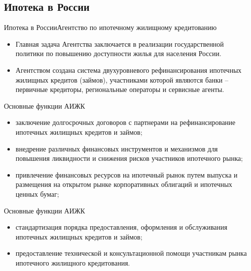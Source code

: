 \documentclass[_Banking_p2.tex]{subfiles}
\begin{document}
\subsection{Ипотека в России}
\begin{frame}{Ипотека в России}{Агентство по ипотечному жилищному кредитованию}
\begin{itemize}[<	+->]

\item
Главная задача Агентства заключается в реализации государственной политики по повышению доступности жилья для населения России.


\item
Агентством создана система двухуровневого рефинансирования ипотечных жилищных кредитов (займов), участниками которой являются банки – первичные кредиторы, региональные операторы и сервисные агенты.
\end{itemize}
\end{frame}

\begin{frame}{Основные функции АИЖК}
\begin{itemize}[<+->]
\item
заключение долгосрочных договоров с партнерами на рефинансирование ипотечных жилищных кредитов и займов;
\item
внедрение различных финансовых инструментов и механизмов для повышения ликвидности и снижения рисков участников ипотечного рынка;
\item
привлечение финансовых ресурсов на ипотечный рынок путем выпуска и размещения на открытом рынке корпоративных облигаций и ипотечных ценных бумаг;
\end{itemize}
\end{frame}

\begin{frame}{Основные функции АИЖК}
\begin{itemize}[<+->]
\item
стандартизация порядка предоставления, оформления и обслуживания ипотечных жилищных кредитов и займов;
\item
предоставление технической и консультационной помощи участникам рынка ипотечного жилищного кредитования. 
\end{itemize}
\end{frame}
\end{document}

